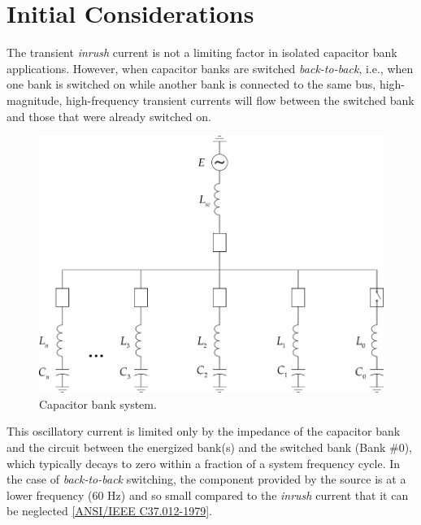 \documentclass[a4paper]{article}
\begin{document}
	
	
	\section{Initial Considerations}
	
	The transient \textit{inrush} current is not a limiting factor in isolated capacitor bank applications. However, when capacitor banks are switched \textit{back-to-back}, i.e., when one bank is switched on while another bank is connected to the same bus, high-magnitude, high-frequency transient currents will flow between the switched bank and those that were already switched on.
	
	\begin{figure}[!hbp]
		\centering
		\includegraphics{Picture1.png}
		\caption{Capacitor bank system.}
		\label{fig:picture1}
	\end{figure}
	
	
	This oscillatory current is limited only by the impedance of the capacitor bank and the circuit between the energized bank(s) and the switched bank (Bank \#0), which typically decays to zero within a fraction of a system frequency cycle. In the case of \textit{back-to-back} switching, the component provided by the source is at a lower frequency (60 Hz) and so small compared to the \textit{inrush} current that it can be neglected \href{https://ieeexplore.ieee.org/document/7035261}{[ANSI/IEEE C37.012-1979]}.
	
\end{document}
